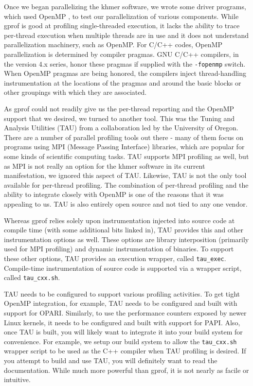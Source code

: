 \documentclass{article}
\begin{document}
Once we began parallelizing the khmer software, we wrote some driver programs,
which used OpenMP \citep{web:OpenMP}, to test our parallelization of various
components. While gprof is good at profiling single-threaded execution, it
lacks the ability to trace per-thread execution when multiple threads are in
use and it does not understand parallelization machinery, such as OpenMP. For
C/C++ codes, OpenMP parallelization is determined by compiler pragmas. GNU
C/C++ compilers, in the version 4.x series, honor these pragmas if supplied
with the \texttt{-fopenmp} switch. When OpenMP pragmas are being honored, the
compilers inject thread-handling instrumentation at the locations of the
pragmas and around the basic blocks or other groupings with which they are
associated.

As gprof could not readily give us the per-thread reporting and the OpenMP
support that we desired, we turned to another tool. This was the Tuning and
Analysis Utilities (TAU) \citep{web:TAU} from a collaboration led by the
University of Oregon. There are a number of parallel profiling tools out there
- many of them focus on programs using MPI (Message Passing Interface)
libraries, which are popular for some kinds of scientific computing tasks. TAU
supports MPI profiling as well, but as MPI is not really an option for the
khmer software in its current manifestation, we ignored this aspect of TAU.
Likewise, TAU is not the only tool available for per-thread profiling. The
combination of per-thread profiling and the ability to integrate closely with
OpenMP is one of the reasons that it was appealing to us. TAU is also entirely
open source and not tied to any one vendor.

Whereas gprof relies solely upon instrumentation injected into source code at
compile time (with some additional bits linked in), TAU provides this and other
instrumentation options as well. These options are library interposition
(primarily used for MPI profiling) and dynamic instrumentation of binaries. To
support these other options, TAU provides an execution wrapper, called
\texttt{tau\_exec}. Compile-time instrumentation of source code is supported
via a wrapper script, called \texttt{tau\_cxx.sh}.

TAU needs to be configured to support various profiling activities.
To get tight OpenMP integration, for example, TAU needs to be
configured and built with support for OPARI. Similarly, to use the
performance counters exposed by newer Linux kernels, it needs to be
configured and built with support for PAPI. Also, once TAU is built,
you will likely want to integrate it into your build system for
convenience. For example, we setup our build system to allow the
\texttt{tau\_cxx.sh} wrapper script to be used as the C++ compiler
when TAU profiling is desired. If you attempt to build and use TAU,
you will definitely want to read the documentation. While much more
powerful than gprof, it is not nearly as facile or intuitive.
\end{document}
